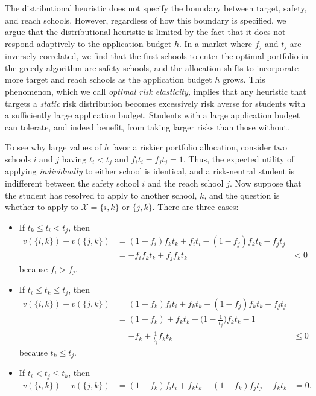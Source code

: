 The distributional heuristic does not specify the boundary between target, safety, and reach schools. However, regardless of how this boundary is specified, we argue that the distributional heuristic is limited by the fact that it does not respond adaptively to the application budget $h$. In a market where $f_j$ and $t_j$ are inversely correlated, we find that the first schools to enter the optimal portfolio in the greedy algorithm are safety schools, and the allocation shifts to incorporate more target and reach schools as the application budget $h$ grows. This phenomenon, which we call \emph{optimal risk elasticity,} implies that any heuristic that targets a \emph{static} risk distribution becomes excessively risk averse for students with a sufficiently large application budget. Students with a large application budget can tolerate, and indeed benefit, from taking larger risks than those without.

To see why large values of $h$ favor a riskier portfolio allocation, consider two schools $i$ and $j$ having $t_i < t_j$ and $f_i t_i = f_j t_j = 1$. Thus, the expected utility of applying \emph{individually} to either school is identical, and a risk-neutral student is indifferent between the safety school $i$ and the reach school $j$. Now suppose that the student has resolved to apply to another school, $k$, and the question is whether to apply to  $\mathcal{X} = \{i, k\}$ or $\{j, k\}$. There are three cases:

\begin{itemize}
\item If $t_k \leq t_i < t_j$, then 
\begin{align*}
v(\{i, k\}) -  v(\{j, k\}) &= (1 - f_i) f_k t_k  + f_i t_i - (1 - f_j) f_k t_k - f_j t_j \\
&=  - f_i f_k t_k + f_j f_k t_k &< 0
\end{align*}
because $f_i > f_j$. 
\item If  $t_i \leq t_k \leq t_j$, then 
\begin{align*}
v(\{i, k\}) -  v(\{j, k\}) &= (1 - f_k ) f_i t_i + f_k t_k - (1 - f_j) f_k t_k - f_j t_j \\
&= (1 - f_k) + f_k t_k - \bigl( 1 - \frac{1}{t_j}\bigr) f_k t_k - 1  \\
&=  - f_k + \frac{1}{t_j} f_k t_k & \leq 0
\end{align*}
because $t_k \leq t_j$.
\item If $t_i < t_j \leq t_k$, then 
\begin{align*}
v(\{i, k\}) -  v(\{j, k\}) &=  (1 - f_k) f_i t_i + f_k t_k - (1 - f_k) f_j t_j - f_k t_k &= 0.
\end{align*}
\end{itemize}

